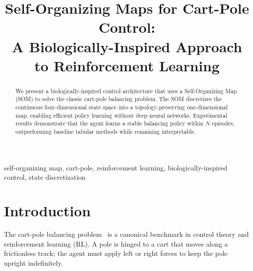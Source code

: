 \documentclass[conference]{IEEEtran}
\begin{document}
\title{Self-Organizing Maps for Cart-Pole Control:\\
A Biologically-Inspired Approach to Reinforcement Learning}

\author{
}

\maketitle

\begin{abstract}
We present a biologically-inspired control architecture that uses a
Self-Organizing Map (SOM) to solve the classic cart-pole balancing problem.
The SOM discretizes the continuous four-dimensional state space into a
topology-preserving one-dimensional map, enabling efficient policy learning
without deep neural networks.
Experimental results demonstrate that the agent learns a stable balancing
policy within \(N\) episodes, outperforming baseline tabular methods while
remaining interpretable.
\end{abstract}

\begin{IEEEkeywords}
self-organizing map, cart-pole, reinforcement learning,
biologically-inspired control, state discretization
\end{IEEEkeywords}

\section{Introduction}
\label{sec:intro}

The cart-pole balancing problem~\cite{barto1983neuronlike} is a canonical
benchmark in control theory and reinforcement learning (RL).
A pole is hinged to a cart that moves along a frictionless track; the agent
must apply left or right forces to keep the pole upright indefinitely.
\end{document}
